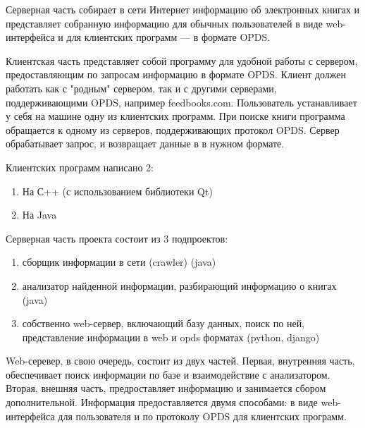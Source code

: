 Серверная часть собирает в сети Интернет информацию об электронных книгах и представляет собранную информацию для обычных пользователей в виде web-интерфейса и для клиентских программ --- в формате OPDS.

Клиентская часть представляет собой программу для удобной работы с сервером, предоставляющим по запросам информацию в формате OPDS. Клиент должен работать как с "родным" сервером, так и с другими серверами, поддерживающими OPDS, например feedbooks.com.
Пользователь устанавливает у себя на машине одну из клиентских программ. При поиске книги программа обращается к одному из серверов, поддерживающих протокол OPDS. Сервер обрабатывает запрос, и возвращает данные в в нужном формате. 

Клиентских программ написано 2:
\begin{enumerate}
	\item На С++ (с использованием библиотеки Qt)
	\item На Java
\end{enumerate}

Серверная часть проекта состоит из 3 подпроектов:
\begin{enumerate}
	\item сборщик информации в сети (crawler) (java)
	\item анализатор найденной информации, разбирающий информацию о книгах (java) 
	\item собственно web-сервер, включающий базу данных, поиск по ней, представление информации в web и opds форматах (python, django)
\end{enumerate}

Web-серевер, в свою очередь, состоит из двух частей. Первая, внутренняя часть, обеспечивает поиск информации по базе и взаимодействие с анализатором.
Вторая, внешняя часть, предроставляет информацию и занимается сбором дополнительной. Информация предоставляется двумя способами: в виде web-интерфейса для пользователя и по протоколу OPDS для клиентских программ.


		
